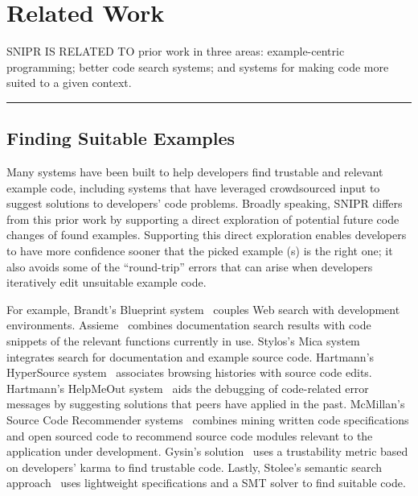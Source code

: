 \chapter{Related Work}{}
\label{sec:related}

\lettrine[lraise=0.1, nindent=0em, slope=-.5em]{S} {NIPR IS RELATED TO} prior work in three areas: example-centric programming; better code search systems; and systems for making code more suited to a given context.

\fancybreak{\pfbreakdisplay}

\section{Finding Suitable Examples}
\label{sec:codesearch}

Many systems have been built to help developers find trustable and relevant example code, including systems that have leveraged crowdsourced input to suggest solutions to developers' code problems. Broadly speaking, \uppercase{SnipR} differs from this prior work by supporting a direct exploration of potential future code changes of found examples. Supporting this direct exploration enables developers to have more confidence sooner that the picked example (s) is the right one; it also avoids some of the ``round-trip'' errors that can arise when developers iteratively edit unsuitable example code.

For example, Brandt’s Blueprint system~\cite{Brandt:2010tp} couples Web search with development environments. Assieme~\cite{Hoffmann:2007wo} combines documentation search results with code snippets of the relevant functions currently in use. Stylos's Mica system~\cite{Stylos:2006gu} integrates search for documentation and example source code. Hartmann's HyperSource system~\cite{Hartmann:2011ii} associates browsing histories with source code edits. Hartmann's HelpMeOut system~\cite{Hartmann:2010hx} aids the debugging of code-related error messages by suggesting solutions that peers have applied in the past. McMillan's Source Code Recommender systems~\cite{McMillan:2012dj} combines mining written code specifications and open sourced code to recommend source code modules relevant to the application under development. Gysin's solution~\cite{Gysin:2010kt} uses a trustability metric based on developers' karma to find trustable code. Lastly, Stolee's semantic search approach~\cite{Stolee:2012wp} uses lightweight specifications and a SMT solver to find suitable code.

